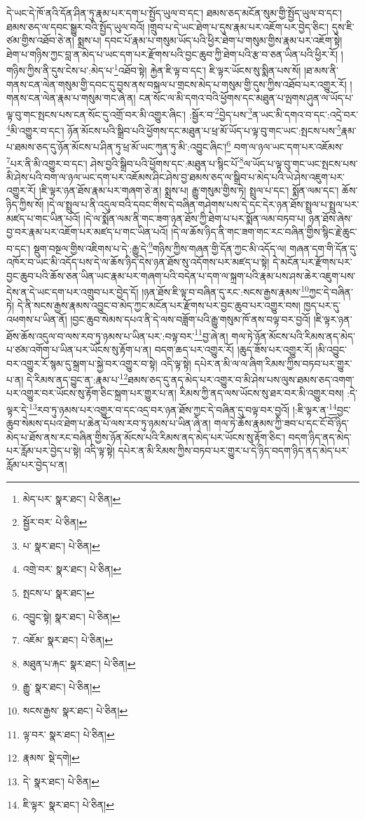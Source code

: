 དེ་ཡང་དེ་ཁོ་ནའི་དོན་ཤིན་ཏུ་རྣམ་པར་དག་པ་སྤྱོད་ཡུལ་བ་དང་། ཐམས་ཅད་མངོན་སུམ་གྱི་སྤྱོད་ཡུལ་བ་དང་། ཐམས་ཅད་ལ་དབང་སྒྱུར་བའི་སྤྱོད་ཡུལ་བའོ། །གྲུབ་པ་དེ་ཡང་ཐེག་པ་དུས་རྣམ་པར་འཇོག་པར་བྱེད་ཅིང་། དུས་ཇི་ཙམ་གྱིས་འཐོབ་ཅེ་ན། སྨྲས་པ། དབང་པོ་རྣམ་པ་གསུམ་ཡོད་པའི་ཕྱིར་ཐེག་པ་གསུམ་གྱིས་རྣམ་པར་འཇོག་སྟེ། ཐེག་པ་གཉིས་ཀྱང་བླ་ན་མེད་པ་ཡང་དག་པར་རྫོགས་པའི་བྱང་ཆུབ་ཀྱི་ཐེག་པའི་རྩ་བ་ཅན་ཡིན་པའི་ཕྱིར་རོ། །གཉིས་ཀྱིས་ནི་དུས་ངེས་པ་:མེད་པ་\footnote{མེད་པར་  སྣར་ཐང་།  པེ་ཅིན། }འཐོབ་སྟེ། རྐྱེན་ཇི་ལྟ་བ་དང་། ཇི་ལྟར་ཡོངས་སུ་སྨིན་པས་སོ། །ཐ་མས་ནི་གནས་ངན་ལེན་གསུམ་གྱི་དབང་དུ་བྱས་ནས་བསྐལ་པ་གྲངས་མེད་པ་གསུམ་གྱི་དུས་ཀྱིས་འཐོབ་པར་འགྱུར་རོ། །གནས་ངན་ལེན་རྣམ་པ་གསུམ་གང་ཞེ་ན། ངན་སོང་ལ་མི་དགའ་བའི་ཕྱོགས་དང་མཐུན་པ་ལྤགས་ཤུན་ལ་ཡོད་པ་ལྟ་བུ་གང་སྤངས་པས་ངན་སོང་དུ་འགྲོ་བར་མི་འགྱུར་ཞིང་། :སྦྱོར་བ་\footnote{སྦྱོར་བར་  པེ་ཅིན། }བྱེད་པས་\footnote{པ་  སྣར་ཐང་།  པེ་ཅིན། }ན་ཡང་མི་དགའ་བ་དང་:འདྲེ་བར་\footnote{འགྲེ་བར་  སྣར་ཐང་།  པེ་ཅིན། }མི་འགྱུར་བ་དང་། ཉོན་མོངས་པའི་སྒྲིབ་པའི་ཕྱོགས་དང་མཐུན་པ་ཕྲ་མོ་ཡོད་པ་ལྟ་བུ་གང་ཡང་:སྤངས་པས་\footnote{སྤངས་པ་  སྣར་ཐང་། }རྣམ་པ་ཐམས་ཅད་དུ་ཉོན་མོངས་པ་ཤིན་ཏུ་ཕྲ་མོ་ཡང་ཀུན་ཏུ་མི་:འབྱུང་ཞིང་།\footnote{འབྱུང་སྟེ།  སྣར་ཐང་།  པེ་ཅིན། } བག་ལ་ཉལ་ཡང་དག་པར་འཇོམས་\footnote{འཇོམ་  སྣར་ཐང་།  པེ་ཅིན། }པར་ནི་མི་འགྱུར་བ་དང་། ཤེས་བྱའི་སྒྲིབ་པའི་ཕྱོགས་དང་:མཐུན་པ་སྙིང་པོ་\footnote{མཐུན་པ་རྐང་  སྣར་ཐང་།  པེ་ཅིན། }ལ་ཡོད་པ་ལྟ་བུ་གང་ཡང་སྤངས་པས་མི་ཤེས་པའི་བག་ལ་ཉལ་ཡང་དག་པར་འཇོམས་ཤིང་ཤེས་བྱ་ཐམས་ཅད་ལ་སྒྲིབ་པ་མེད་པའི་ཡེ་ཤེས་འཇུག་པར་འགྱུར་རོ། །ཇི་ལྟར་ཉན་ཐོས་རྣམ་པར་གཞག་ཅེ་ན། སྨྲས་པ། རྒྱུ་གསུམ་གྱིས་ཏེ། སྤྲུལ་པ་དང་། སྨོན་ལམ་དང་། ཆོས་ཉིད་ཀྱིས་སོ། །དེ་ལ་སྤྲུལ་པ་ནི་འདུལ་བའི་དབང་གིས་དེ་བཞིན་གཤེགས་པས་དེ་དང་དེར་ཉན་ཐོས་སྤྲུལ་པ་སྤྲུལ་པར་མཛད་པ་གང་ཡིན་པའོ། །དེ་ལ་སྨོན་ལམ་ནི་གང་ཟག་ཉན་ཐོས་ཀྱི་ཐེག་པ་པར་སྨོན་ལམ་བཏབ་པ། ཉན་ཐོས་ཞེས་བྱ་བར་རྣམ་པར་འཇོག་པར་མཛད་པ་གང་ཡིན་པའོ། །དེ་ལ་ཆོས་ཉིད་ནི་གང་ཟག་གང་རང་བཞིན་གྱིས་སྙིང་རྗེ་ཆུང་བ་དང་། སྡུག་བསྔལ་གྱིས་འཇིགས་པ་དེ་:རྒྱུ་དེ་\footnote{རྒྱུ་  སྣར་ཐང་།  པེ་ཅིན། }གཉིས་ཀྱིས་གཞན་གྱི་དོན་ཀྱང་མི་འདོད་ལ། གཞན་དག་གི་དོན་དུ་འཁོར་བ་ཡང་མི་འདོད་པས་དེ་ལ་ཆོས་ཉིད་དེས་ཉན་ཐོས་སུ་འདོགས་པར་མཛད་པ་སྟེ། དེ་མངོན་པར་རྫོགས་པར་བྱང་ཆུབ་པའི་ཆོས་ཅན་ཡིན་ཡང་རྣམ་པར་གཞག་པའི་བདེན་པ་དག་ལ་སྐྲག་པའི་རྣམ་པས་ཤས་ཆེར་འཇུག་པས་དེས་ན་དེ་ཡང་དག་པར་འགྲུབ་པར་བྱེད་དོ། །ཉན་ཐོས་ཇི་ལྟ་བ་བཞིན་དུ་རང་:སངས་རྒྱས་རྣམས་\footnote{སངས་རྒྱས་  སྣར་ཐང་།  པེ་ཅིན། }ཀྱང་དེ་བཞིན་ཏེ། དེ་ནི་སངས་རྒྱས་རྣམས་འབྱུང་བ་མེད་ཀྱང་མངོན་པར་རྫོགས་པར་བྱང་ཆུབ་པར་འགྱུར་བས། ཁྱད་པར་དུ་འཕགས་པ་ཡིན་ནོ། །བྱང་ཆུབ་སེམས་དཔའ་ནི་དེ་ལས་བཟློག་པའི་རྒྱུ་གསུམ་ཁོ་ནས་བལྟ་བར་བྱའོ། །ཇི་ལྟར་ཉན་ཐོས་ཆོས་འདུལ་བ་ལས་རབ་ཏུ་ཉམས་པ་ཡིན་པར་:བལྟ་བར་\footnote{ལྟ་བར་  སྣར་ཐང་།  པེ་ཅིན། }བྱ་ཞེ་ན། གལ་ཏེ་ཉོན་མོངས་པའི་རིམས་ནད་མེད་པ་ཙམ་འགོག་པ་ཡིན་པར་ཡོངས་སུ་རྟོག་པ་ན། བདག་ཆད་པར་འགྱུར་རོ། །ཆུད་ཟོས་པར་འགྱུར་རོ། །མི་འབྱུང་བར་འགྱུར་རོ་སྙམ་དུ་སྐྲག་པ་སྐྱེ་བར་འགྱུར་བ་སྟེ། འདི་ལྟ་སྟེ། དཔེར་ན་མི་ལ་ལ་ཞིག་རིམས་ཀྱིས་བཏབ་པར་གྱུར་པ་ན། དེ་རིམས་ནད་བྱུང་ན་:རྣམ་པ་\footnote{རྣམས་  སྡེ་དགེ། }ཐམས་ཅད་དུ་ནད་མེད་པར་འགྱུར་བ་མི་ཤེས་པས་ལུས་ཐམས་ཅད་འགག་པར་འགྱུར་བར་ཡོངས་སུ་རྟོག་ཅིང་སྐྲག་པར་གྱུར་པ་ན། རིམས་ཀྱི་ནད་ལས་ཡོངས་སུ་ཐར་བར་མི་འགྱུར་བས། :དེ་ལྟར་དེ་\footnote{དེ་  སྣར་ཐང་།  པེ་ཅིན། }རབ་ཏུ་ཉམས་པར་འགྱུར་བ་དང་འདྲ་བར་ཉན་ཐོས་ཀྱང་དེ་བཞིན་དུ་བལྟ་བར་བྱའོ། །:ཇི་ལྟར་ན་\footnote{ཇི་ལྟར་  སྣར་ཐང་།  པེ་ཅིན། }བྱང་ཆུབ་སེམས་དཔའ་ཐེག་པ་ཆེན་པོ་ལས་རབ་ཏུ་ཉམས་པ་ཡིན་ཞེ་ན། གལ་ཏེ་ཆོས་རྣམས་ཀྱི་ཟབ་པ་དང་ངོ་བོ་ཉིད་མེད་པ་ཐོས་ནས་རང་བཞིན་གྱིས་ཉོན་མོངས་པའི་རིམས་ནད་མེད་པར་ཡོངས་སུ་རྟོག་ཅིང་། བདག་ཉིད་ནད་མེད་པར་རློམ་པར་བྱེད་པ་སྟེ། འདི་ལྟ་སྟེ། དཔེར་ན་མི་རིམས་ཀྱིས་བཏབ་པར་གྱུར་པ་དེ་ཉིད་བདག་ཉིད་ནད་མེད་པར་རློམ་པར་བྱེད་པ་ན། 